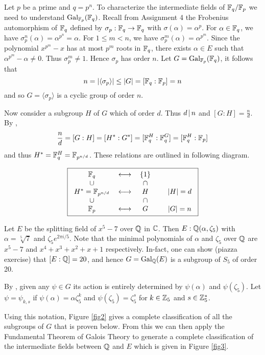 \documentclass[11pt]{article}
\begin{document}
\begin{example}
    Let $p$ be a prime and $q=p^n$. To characterize the intermediate fields of $\mathbb{F}_q/\mathbb{F}_p$ we need to understand $\operatorname{Gal}_{\mathbb{F}_p}(\mathbb{F}_q)$. Recall from Assignment 4 the Frobenius automorphism of $\mathbb{F}_q$ defined by $\sigma_p:\mathbb{F}_q\to\mathbb{F}_q$ with $\sigma(\alpha)=\alpha^p$. For $\alpha\in\mathbb{F}_q$, we have $\sigma_p^n(\alpha)=\alpha^{p^n}=\alpha$. For $1\leq m<n$, we have $\sigma_p^m(\alpha)=\alpha^{p^m}$. Since the polynomial $x^{p^m}-x$ has at most $p^m$ roots in $\mathbb{F}_q$, there exists $\alpha\in E$ such that $\alpha^{p^m}-\alpha\neq0$. Thus $\sigma_p^m\neq1$. Hence $\sigma_p$ has order $n$. Let $G=\operatorname{Gal}_{\mathbb{F}_p}(\mathbb{F}_q)$, it follows that
    \[n=|\langle\sigma_p\rangle|\leq|G|=[\mathbb{F}_q:\mathbb{F}_p]=n\]
    and so $G=\langle\sigma_p\rangle$ is a cyclic group of order $n$.

    Now consider a subgroup $H$ of $G$ which of order $d$. Thus $d\,|\, n$ and $[G:H]=\frac{n}{d}$. By ,
    \[\frac{n}{d}=[G:H]=[H^*:G^*]=[\mathbb{F}_q^H:\mathbb{F}_q^G]=[\mathbb{F}_q^H:\mathbb{F}_p]\]
    and thus $H^*=\mathbb{F}_q^H=\mathbb{F}_{p^{n/d}}$. These relations are outlined in following diagram.
\end{example}

\[\fbox{\begin{tabular}{ccccc}
    $\F_q$ & $\longleftrightarrow$ & $\{1\}$ \\
    $\cup$ & & $\cap$ \\
    $H^*=\F_{p^{n/d}}$ & $\longleftrightarrow$ & $H$ && $|H|=d$ \\
    $\cup$ & & $\cap$ \\
    $\F_p$ & $\longleftrightarrow$ & $G$ && $|G|=n$
\end{tabular}}\]

\begin{example}
    Let $E$ be the splitting field of $x^5-7$ over $\mathbb{Q}$ in $\mathbb{C}$. Then $E:\mathbb{Q}(\alpha,\zeta_5)$ with $\alpha=\sqrt[5]{7}$ and $\zeta_5e^{2\pi i/5}$. Note that the minimal polynomials of $\alpha$ and $\zeta_5$ over $\mathbb{Q}$ are $x^5-7$ and $x^4+x^3+x^2+x+1$ respectively. In-fact, one can show (piazza exercise) that $[E:\mathbb{Q}]=20$, and hence $G=\operatorname{Gal}_{\mathbb{Q}}(E)$ is a subgroup of $S_5$ of order 20.

    By , given any $\psi\in G$ its action is entirely determined by $\psi(\alpha)$ and $\psi(\zeta_5)$. Let $\psi=\psi_{k,s}$ if $\psi(\alpha)=\alpha\zeta_5^k$ and $\psi(\zeta_5)=\zeta_5^s$ for $k\in\mathbb{Z}_5$ and $s\in\mathbb{Z}_5^*$.
    
    Using this notation, Figure \ref{fig2} gives a complete classification of all the subgroups of $G$ that is proven below. From this we can then apply the Fundamental Theorem of Galois Theory to generate a complete classification of the intermediate fields between $\mathbb{Q}$ and $E$ which is given in Figure \ref{fig3}.
\end{example}
\end{document}
